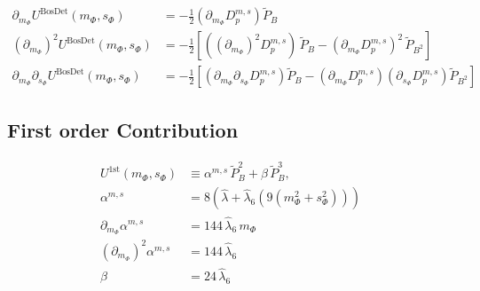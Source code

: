\begin{align}\label{eq:CEP_derivative_dm_bosonicContribution}
 \partial_{m_{\Phi}}  U^{\text{BosDet}}(m_{\Phi}, s_{\Phi}) &= - \frac{1}{2} \left( \partial_{m_{\Phi}} D_p^{m,s} \right) \tilde P_B 
       \\ \label{eq:CEP_derivative_dmdm_bosonicContribution}
%        
 \left(\partial_{m_{\Phi}} \right)^2 U^{\text{BosDet}}(m_{\Phi}, s_{\Phi}) &= - \frac{1}{2}\left[ \left( \left(\partial_{m_{\Phi}}\right)^2 D_p^{m,s} \right) \, \tilde P_B
                   - \left( \partial_{m_{\Phi}} D_p^{m,s} \right)^2 \, \tilde P_{B^2}    \right]
              \\ \label{eq:CEP_derivative_dmds_bosonicContribution}
%               
\partial_{m_{\Phi}} \partial_{s_{\Phi}}  U^{\text{BosDet}}(m_{\Phi}, s_{\Phi}) &= - \frac{1}{2}
                   \left[ \left( \partial_{m_{\Phi}} \partial_{s_{\Phi}} D_p^{m,s} \right) \tilde P_B 
                   - \left( \partial_{m_{\Phi}}  D_p^{m,s} \right)\left( \partial_{s_{\Phi}}  D_p^{m,s} \right)\tilde P_{B^2} \right]
\end{align}
% 
\subsection*{First order Contribution}
\begin{align}\label{eq:CEP_firstWithDet_shortcuts}
 U^{\text{1st}}(m_{\Phi}, s_{\Phi}) & \equiv \alpha^{m, s}\, \tilde P_B^2 + \beta\, \tilde P_B^3,
        \\ \label{CE:CEP_firstWithDet_shrotcut_alpha}
 \alpha^{m, s}  & = 8 \left(\hat \lambda + \hat\lambda_6\left( 9\left( m_{\Phi}^2 + s_{\Phi}^2 \right) \right) \right)
        \\ \label{CE:CEP_firstWithDet_shrotcut_dm_alpha}
 \partial_{m_{\Phi}} \alpha^{m, s}  & = 144\, \hat\lambda_6\, m_{\Phi}
        \\ \label{CE:CEP_firstWithDet_shrotcut_dmdm_alpha}
 \left(\partial_{m_{\Phi}}\right)^2 \alpha^{m, s}  & = 144\, \hat\lambda_6
        \\ \label{CE:CEP_firstWithDet_shrotcut_beta}
 \beta  & = 24\, \hat\lambda_6
\end{align}

